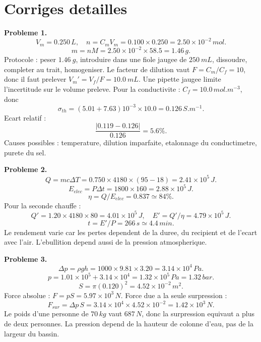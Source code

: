 \documentclass[11pt,a4paper]{article}
\begin{document}
\newpage


\section{Corriges detailles}

\begin{corrige}
\textbf{Probleme 1.} 
\[
V_m=0.250\,L,\quad n=C_mV_m=0.100\times0.250=2.50\times10^{-2}\,mol.
\]
\[
m=nM=2.50\times10^{-2}\times58.5=1.46\,g.
\]
Protocole : peser \(\SI{1.46}{g}\), introduire dans une fiole jaugee de \(\SI{250}{mL}\), dissoudre, completer au trait, homogeniser. Le facteur de dilution vaut \(F=C_m/C_f=10\), donc il faut prelever \(V_m'=V_f/F=\SI{10.0}{mL}\). Une pipette jaugee limite l'incertitude sur le volume preleve. Pour la conductivite : \(C_f=10.0\,mol.m^{-3}\), donc
\[
\sigma_{th}=(5.01+7.63)10^{-3}\times10.0=0.126\,S.m^{-1}.
\]
Ecart relatif :
\[
\frac{|0.119-0.126|}{0.126}=5.6\%.
\]
Causes possibles : temperature, dilution imparfaite, etalonnage du conductimetre, purete du sel.
\end{corrige}

\begin{corrige}
\textbf{Probleme 2.}
\[
Q=mc\Delta T=0.750\times4180\times(95-18)=2.41\times10^5\,J.
\]
\[
E_{elec}=P\Delta t=1800\times160=2.88\times10^5\,J.
\]
\[
\eta=Q/E_{elec}=0.837\simeq84\%.
\]
Pour la seconde chauffe :
\[
Q'=1.20\times4180\times80=4.01\times10^5\,J,
\quad E'=Q'/\eta=4.79\times10^5\,J.
\]
\[
t=E'/P=266\,s\simeq4.4\,min.
\]
Le rendement varie car les pertes dependent de la duree, du recipient et de l'ecart avec l'air. L'ebullition depend aussi de la pression atmospherique.
\end{corrige}

\begin{corrige}
\textbf{Probleme 3.}
\[
\Delta p=\rho gh=1000\times9.81\times3.20=3.14\times10^4\,Pa.
\]
\[
p=1.01\times10^5+3.14\times10^4=1.32\times10^5\,Pa=1.32\,bar.
\]
\[
S=\pi(0.120)^2=4.52\times10^{-2}\,m^2.
\]
Force absolue : \(F=pS=5.97\times10^3\,N\). Force due a la seule surpression :
\[
F_{sur}=\Delta p\,S=3.14\times10^4\times4.52\times10^{-2}=1.42\times10^3\,N.
\]
Le poids d'une personne de \(70\,kg\) vaut \(687\,N\), donc la surpression equivaut a plus de deux personnes. La pression depend de la hauteur de colonne d'eau, pas de la largeur du bassin.
\end{corrige}
\end{document}
